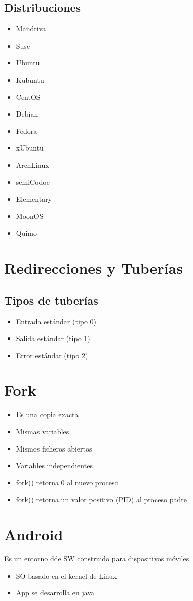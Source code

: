 \documentclass[12pt,a4paper]{report}
\begin{document}
\section{Distribuciones}
\begin{itemize}
\item Mandriva
\item Suse
\item Ubuntu
\item Kubuntu
\item CentOS
\item Debian
\item Fedora
\item xUbuntu
\item ArchLinux
\item semiCodoe
\item Elementary
\item MoonOS
\item Quimo
\end{itemize}

\chapter{Redirecciones y Tuber\'{i}as}
\section{Tipos de tuber\'{i}as}
\begin{itemize}
\item Entrada est\'{a}ndar (tipo 0)
\item Salida est\'{a}ndar (tipo 1)
\item Error est\'{a}ndar (tipo 2)
\end{itemize}

\chapter{Fork}
\begin{itemize}
\item Es una copia exacta
\item Mismas variables
\item Mismos ficheros abiertos
\item Variables independientes
\item fork() retorna 0 al nuevo proceso
\item fork() retorna un valor positivo (PID) al proceso padre
\end{itemize}

\chapter{Android}
Es un entorno dde SW construido para dispositivos móviles
\begin{itemize}
\item SO basado en el kernel de Linux
\item App se desarrolla en java
\end{itemize}
\end{document}
